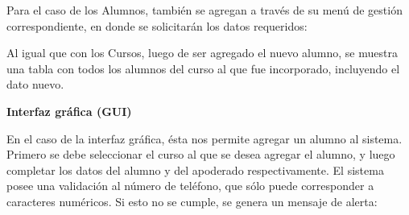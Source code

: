 Para el caso de los Alumnos, también se agregan a través de su menú de gestión correspondiente, en donde se solicitarán los datos requeridos:


Al igual que con los Cursos, luego de ser agregado el nuevo alumno, se muestra una tabla con todos los alumnos del curso al que fue incorporado, incluyendo el dato nuevo.

\textbf{Interfaz gráfica (GUI)}

\begin{figure}[h]
    \centering
\end{figure}

En el caso de la interfaz gráfica, ésta nos permite agregar un alumno al sistema. Primero se debe seleccionar el curso al que se desea agregar el alumno, y luego completar los datos del alumno y del apoderado respectivamente. El sistema posee una validación al número de teléfono, que sólo puede corresponder a caracteres numéricos. Si esto no se cumple, se genera un mensaje de alerta:

\clearpage

\begin{figure}[h]
    \centering
\end{figure}

